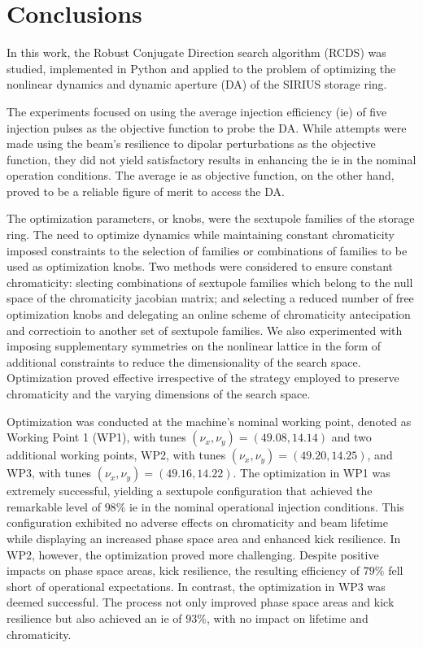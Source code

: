 \chapter{Conclusions}

In this work, the Robust Conjugate Direction search algorithm (\gls*{RCDS}) was studied, implemented in Python and applied to the problem of optimizing the nonlinear dynamics and dynamic aperture (\gls*{DA}) of the SIRIUS storage ring.

The experiments focused on using the average injection efficiency (\gls*{ie}) of five injection pulses as the objective function to probe the \gls*{DA}. While attempts were made using the beam's resilience to dipolar perturbations as the objective function, they did not yield satisfactory results in enhancing the \gls*{ie} in the nominal operation conditions. The average \gls*{ie} as objective function, on the other hand, proved to be a reliable figure of merit to access the \gls*{DA}.

The optimization parameters, or knobs, were the sextupole families of the storage ring. The need to optimize dynamics while maintaining constant chromaticity imposed constraints to the selection of families or combinations of families to be used as optimization knobs. Two methods were considered to ensure constant chromaticity: slecting combinations of sextupole families which belong to the null space of the chromaticity jacobian matrix; and selecting a reduced number of free optimization knobs and delegating an online scheme of chromaticity antecipation and correctioin to another set of sextupole families. We also experimented with imposing supplementary symmetries on the nonlinear lattice in the form of additional constraints to reduce the dimensionality of the search space. Optimization proved effective irrespective of the strategy employed to preserve chromaticity and the varying dimensions of the search space.

Optimization was conducted at the machine's nominal working point, denoted as Working Point 1 (\gls*{WP1}), with tunes $(\nu_x, \nu_y)=(49.08, 14.14)$ and two additional working points, \gls*{WP2}, with tunes $(\nu_x, \nu_y)=(49.20, 14.25)$, and \gls*{WP3}, with tunes $(\nu_x, \nu_y)=(49.16, 14.22)$. The optimization in WP1 was extremely successful, yielding a sextupole configuration that achieved the remarkable level of $98\%$ \gls*{ie} in the nominal operational injection conditions. This configuration exhibited no adverse effects on chromaticity and beam lifetime while displaying an increased phase space area and enhanced kick resilience. In \gls*{WP2}, however, the optimization proved more challenging. Despite positive impacts on phase space areas, kick resilience, the resulting efficiency of $79\%$ fell short of operational expectations. In contrast, the optimization in \gls*{WP3} was deemed successful. The process not only improved phase space areas and kick resilience but also achieved an \gls*{ie} of $93\%$, with no impact on lifetime and chromaticity.

